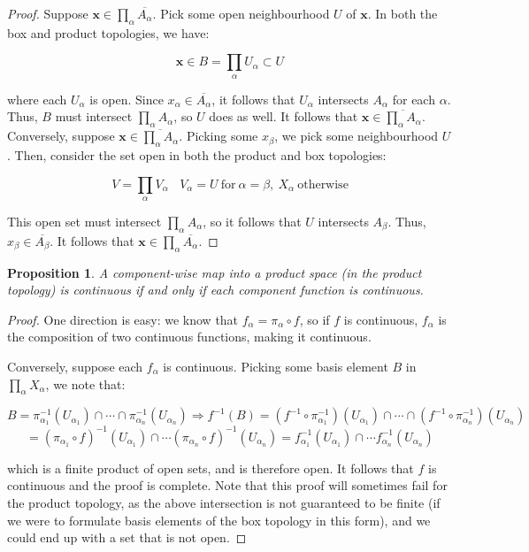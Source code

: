 \documentclass[10pt, oneside]{amsart}
\newtheorem{prop}{Proposition}
\newcommand{\bm}{\boldsymbol}
\begin{document}
    \begin{proof}
      Suppose $\bm{x} \in \prod_{\alpha} \overline{A_\alpha}$. Pick some open neighbourhood $U$ of $\bm{x}$. In both the box and product topologies, we have:

      $$\bm{x} \in B = \displaystyle\prod_{\alpha} U_{\alpha} \subset U$$

      where each $U_{\alpha}$ is open. Since $x_{\alpha} \in \overline{A_\alpha}$, it follows that $U_{\alpha}$ intersects $A_{\alpha}$ for each $\alpha$. Thus, $B$ must intersect $\prod_{\alpha} A_{\alpha}$,
      so $U$ does as well. It follows that $\bm{x} \in \overline{\prod_{\alpha} A_{\alpha}}$. Conversely, suppose $\bm{x} \in \overline{\prod_{\alpha} A_{\alpha}}$. Picking some $x_{\beta}$, we pick some neighbourhood
      $U$. Then, consider the set open in both the product and box topologies:

      $$V = \displaystyle\prod_{\alpha} V_{\alpha} \ \ \ \ V_{\alpha} = U \ \text{for} \ \alpha = \beta, \ X_{\alpha} \ \text{otherwise}$$

      This open set must intersect $\prod_{\alpha} A_{\alpha}$, so it follows that $U$ intersects $A_{\beta}$. Thus, $x_{\beta} \in \overline{A_{\beta}}$. It follows that $\bm{x} \in \prod_{\alpha} \overline{A_{\alpha}}$.
    \end{proof}

    \begin{prop}
      A component-wise map into a product space (in the product topology) is continuous if and only if each component function is continuous.
    \end{prop}

    \begin{proof}
      One direction is easy: we know that $f_{\alpha} = \pi_{\alpha} \circ f$, so if $f$ is continuous, $f_{\alpha}$ is the composition of two continuous functions, making it continuous.
      \newline

      Conversely, suppose each $f_{\alpha}$ is continuous. Picking some basis element $B$ in $\prod_{\alpha} X_{\alpha}$, we note that:

      $$B = \pi_{\alpha_1}^{-1}(U_{\alpha_1}) \cap \cdots \cap \pi_{\alpha_n}^{-1}(U_{\alpha_n}) \Rightarrow f^{-1}(B) = (f^{-1} \circ \pi_{\alpha_1}^{-1})(U_{\alpha_1}) \cap \cdots \cap (f^{-1} \circ \pi_{\alpha_n}^{-1})(U_{\alpha_n})$$
      $$ = (\pi_{\alpha_1} \circ f)^{-1}(U_{\alpha_1}) \cap \cdots (\pi_{\alpha_n} \circ f)^{-1}(U_{\alpha_n}) = f_{\alpha_1}^{-1}(U_{\alpha_1}) \cap \cdots f_{\alpha_n}^{-1}(U_{\alpha_n})$$

      which is a finite product of open sets, and is therefore open. It follows that $f$ is continuous and the proof is complete. Note that this proof will sometimes fail for the product topology, as
      the above intersection is not guaranteed to be finite (if we were to formulate basis elements of the box topology in this form), and we could end up with a set that is not open.
    \end{proof}
\end{document}
